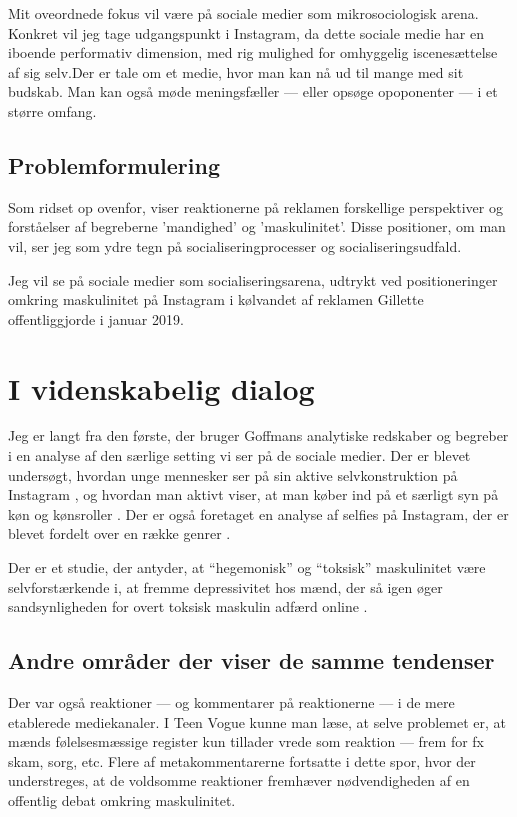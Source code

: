 Mit oveordnede fokus vil være på sociale medier som
mikrosociologisk arena. Konkret vil jeg tage udgangspunkt i
Instagram, da dette sociale medie har en iboende performativ
dimension, med rig mulighed for omhyggelig iscenesættelse af sig
selv.Der er tale om et medie, hvor man kan nå ud til mange med sit
budskab. Man kan også møde meningsfæller — eller opsøge
opoponenter — i et større omfang.

\subsection{Problemformulering}

Som ridset op ovenfor, viser reaktionerne på reklamen forskellige
perspektiver og forståelser af begreberne 'mandighed' og
'maskulinitet'. Disse positioner, om man vil, ser jeg som ydre
tegn på socialiseringprocesser og socialiseringsudfald. 

Jeg vil se på sociale medier som socialiseringsarena, udtrykt ved
positioneringer omkring maskulinitet på Instagram i kølvandet af
reklamen Gillette offentliggjorde i januar 2019.

\section{I videnskabelig dialog}

Jeg er langt fra den første, der bruger Goffmans analytiske 
redskaber og begreber i en analyse af den særlige setting vi ser 
på de sociale medier. Der er blevet undersøgt, hvordan unge 
mennesker ser på sin aktive selvkonstruktion på Instagram 
\autocite{seehaferNOFILTERExplorationInstagram2017a}, og hvordan 
man aktivt viser, at man køber ind på et særligt syn på køn og 
kønsroller \autocite{bakerGoodMorningFitfam2018}. Der er også 
foretaget en analyse af selfies på Instagram, der er blevet 
fordelt over en række genrer \autocite{MISSING}.

Der er et studie, der antyder, at “hegemonisk” og “toksisk” 
maskulinitet være selvforstærkende i, at fremme depressivitet hos 
mænd, der så igen øger sandsynligheden for overt toksisk maskulin 
adfærd online \autocite{parentSocialMediaBehavior2018}.

\subsection{Andre områder der viser de samme tendenser} 

Der var også reaktioner — og kommentarer på reaktionerne — i de
mere etablerede mediekanaler. I Teen Vogue kunne man læse, at
selve problemet er, at mænds følelsesmæssige register kun tillader
vrede som reaktion — frem for fx skam, sorg, etc. Flere af
metakommentarerne fortsatte i dette spor, hvor der understreges,
at de voldsomme reaktioner fremhæver nødvendigheden af en
offentlig debat omkring maskulinitet. 

